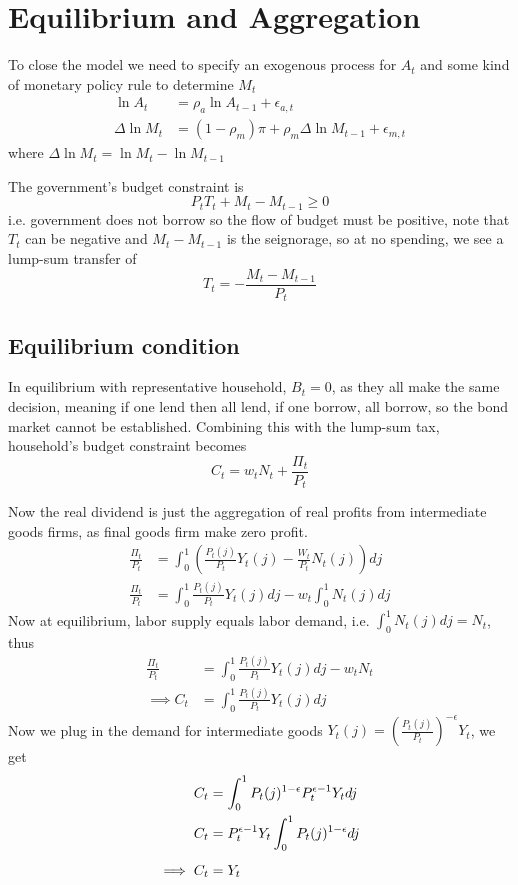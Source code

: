 \documentclass[twocolumn, fleqn]{article}
\begin{document}
	\section{Equilibrium and Aggregation}
	To close the model we need to specify an exogenous process for $A_t$ and some kind of monetary policy rule to determine $M_t$
	\begin{align}
		\ln A_t &= \rho_a \ln A_{t-1} +\epsilon_{a,t}\\
		\Delta \ln M_t &= (1-\rho_m)\pi + \rho_m \Delta \ln M_{t-1}+\epsilon_{m,t}
	\end{align}
	where $\Delta \ln M_t = \ln M_t - \ln M_{t-1}$
	
	The government's budget constraint is 
	\[P_t T_t + M_t - M_{t-1} \geq 0\]
	i.e. government does not borrow so the flow of budget must be positive, note that $T_t$ can be negative and $M_t-M_{t-1}$ is the seignorage, so at no spending, we see a lump-sum transfer of 
	\[T_t = - \frac{M_t - M_{t-1}}{P_t} \]
	
	\subsection{Equilibrium condition}
	In equilibrium with representative household, $B_t=0$, as they all make the same decision, meaning if one lend then all lend, if one borrow, all borrow, so the bond market cannot be established. 
	Combining this with the lump-sum tax, household's budget constraint becomes 
	\[C_t = w_t N_t + \frac{\Pi_t}{P_t}\]
	
	Now the real dividend is just the aggregation of real profits from intermediate goods firms, as final goods firm make zero profit.
	\begin{align*}
		\frac{\Pi_t}{P_t} &= \int_0^1 \left( \frac{P_t(j)}{P_t} Y_t(j) - \frac{W_t}{P_t} N_t(j) \right) dj\\
		\frac{\Pi_t}{P_t} &= \int_0^1 \frac{P_t(j)}{P_t} Y_t(j) dj - w_t \int_0^1 N_t(j) dj
	\end{align*}
	Now at equilibrium, labor supply equals labor demand, i.e. $\int_0^1 N_t(j)dj =N_t$, thus 
	\begin{align*}
		\frac{\Pi_t}{P_t} &= \int_0^1 \frac{P_t(j)}{P_t} Y_t(j) dj - w_t N_t\\[5pt]
		\implies C_t &= \int_0^1 \frac{P_t(j)}{P_t} Y_t(j) dj
	\end{align*}
	Now we plug in the demand for intermediate goods $Y_t(j) = \left( \frac{P_t(j)}{P_t} \right)^{-\epsilon} Y_t$, we get
	\begin{align}
		C_t &= \int_0^1 P_t(j)^{1-\epsilon} P_t^{\epsilon-1} Y_t dj \notag\\
		C_t &= P_t^{\epsilon-1} Y_t \int_0^1 P_t(j)^{1-\epsilon} dj \notag\\[5pt]
		\implies C_t &= Y_t
	\end{align}
	
\end{document}

